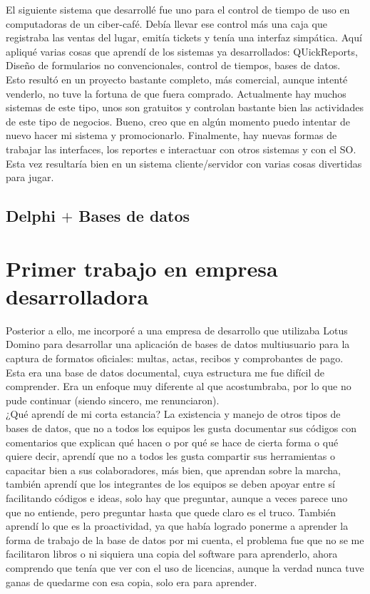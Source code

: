 \documentclass[12pt,spanish,lettersize]{book}
\begin{document}
El siguiente sistema que desarrollé fue uno para el control de tiempo de uso en computadoras de un ciber-café. Debía llevar ese control más una caja que registraba las ventas del lugar, emitía tickets y tenía una interfaz simpática. Aquí apliqué varias cosas que aprendí de los sistemas ya desarrollados: QUickReports, Diseño de formularios no convencionales, control de tiempos, bases de datos.\\

Esto resultó en un proyecto bastante completo, más comercial, aunque intenté venderlo, no tuve la fortuna de que fuera comprado. Actualmente hay muchos sistemas de este tipo, unos son gratuitos y controlan bastante bien las actividades de este tipo de negocios. Bueno, creo que en algún momento puedo intentar de nuevo hacer mi sistema y promocionarlo. Finalmente, hay nuevas formas de trabajar las interfaces, los reportes e interactuar con otros sistemas y con el SO. Esta vez resultaría bien en un sistema cliente/servidor con varias cosas divertidas para jugar.

\subsection{Delphi $+$ Bases de datos}

\section{Primer trabajo en empresa desarrolladora}
Posterior a ello, me incorporé a una empresa de desarrollo que utilizaba Lotus Domino para desarrollar una aplicación de bases de datos multiusuario para la captura de formatos oficiales: multas, actas, recibos y comprobantes de pago. Esta era una base de datos documental, cuya estructura me fue difícil de comprender. Era un enfoque muy diferente al que acostumbraba, por lo que no pude continuar (siendo sincero, me renunciaron).\\

¿Qué aprendí de mi corta estancia? La existencia y manejo de otros tipos de bases de datos, que no a todos los equipos les gusta documentar sus códigos con comentarios que explican qué hacen o por qué se hace de cierta forma o qué quiere decir, aprendí que no a todos les gusta compartir sus herramientas o capacitar bien a sus colaboradores, más bien, que aprendan sobre la marcha, también aprendí que los integrantes de los equipos se deben apoyar entre sí facilitando códigos e ideas, solo hay que preguntar, aunque a veces parece uno que no entiende, pero preguntar hasta que quede claro es el truco. También aprendí lo que es la proactividad, ya que había logrado ponerme a aprender la forma de trabajo de la base de datos por mi cuenta, el problema fue que no se me facilitaron libros o ni siquiera una copia del software para aprenderlo, ahora comprendo que tenía que ver con el uso de licencias, aunque la verdad nunca tuve ganas de quedarme con esa copia, solo era para aprender. 
\end{document}
